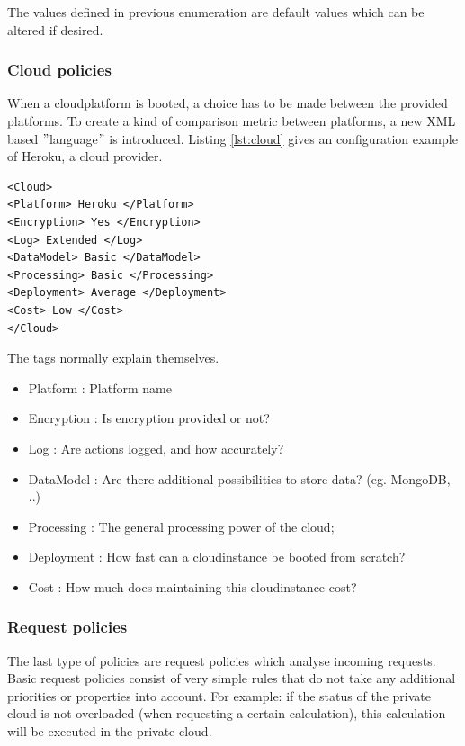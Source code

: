 \documentclass[journal]{IEEEtran}
\begin{document}
The values defined in previous enumeration are default values which can be altered if desired.\newline

\subsubsection{Cloud policies}
When a cloudplatform is booted, a choice has to be made between the provided platforms.
To create a kind of comparison metric between platforms, a new XML based $"$language$"$ is introduced.
Listing \ref{lst:cloud} gives an configuration example of Heroku, a cloud provider. 
\begin{lstlisting}[caption=Cloud describing XML,label={lst:cloud}, frame=single]
<Cloud>
<Platform> Heroku </Platform>
<Encryption> Yes </Encryption>
<Log> Extended </Log>
<DataModel> Basic </DataModel>
<Processing> Basic </Processing>
<Deployment> Average </Deployment> 
<Cost> Low </Cost>
</Cloud>
\end{lstlisting}

The tags normally explain themselves.
\begin{itemize}
    \item Platform : Platform name
    \item Encryption : Is encryption provided or not?
    \item Log : Are actions logged, and how accurately?
    \item DataModel : Are there additional possibilities to store data? (eg. MongoDB, ..)
    \item Processing : The general processing power of the cloud;
    \item Deployment : How fast can a cloudinstance be booted from scratch?
    \item Cost : How much does maintaining this cloudinstance cost?
\end{itemize}
\subsubsection{Request policies}
The last type of policies are request policies which analyse incoming requests.
Basic request policies consist of very simple rules that do not take any additional priorities or properties into account.
For example: if the status of the private cloud is not overloaded (when requesting a certain calculation), this calculation will be executed in the private cloud.\newline
\end{document}
